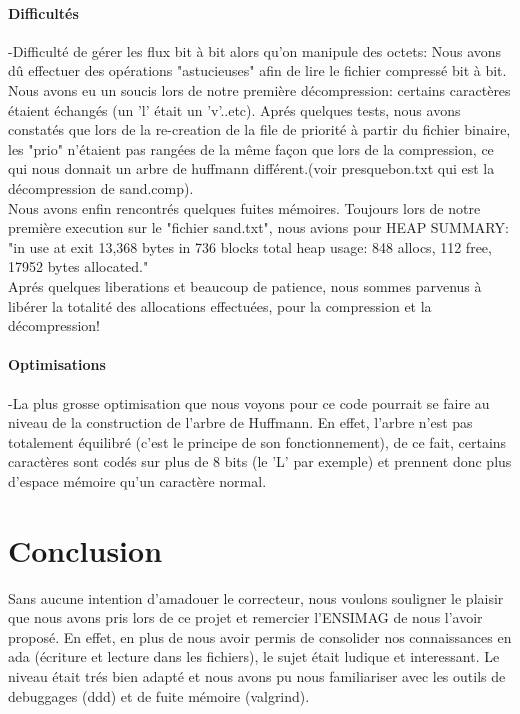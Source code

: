 \documentclass[11pt]{article}
\begin{document}
\paragraph{Difficultés}
-Difficulté de gérer les flux bit à bit alors qu'on manipule des octets: Nous avons dû effectuer des opérations "astucieuses" afin de lire le fichier compressé bit à bit.\\Nous avons eu un soucis lors de notre première décompression: certains caractères étaient échangés (un 'l' était un 'v'..etc). Aprés quelques tests, nous avons constatés que lors de la re-creation de la file de priorité à partir du fichier binaire, les "prio" n'étaient pas rangées de la même façon que lors de la compression, ce qui nous donnait un arbre de huffmann différent.(voir presquebon.txt qui est la décompression de sand.comp).\\Nous avons enfin rencontrés quelques fuites mémoires. Toujours lors de notre première execution sur le "fichier sand.txt", nous avions pour HEAP SUMMARY:\\
"in use at exit 13,368 bytes in 736 blocks
total heap usage: 848 allocs, 112 free, 17952 bytes allocated."\\Aprés quelques liberations et beaucoup de patience, nous sommes parvenus à libérer la totalité des allocations effectuées, pour la compression et la décompression!

\paragraph{Optimisations}-La plus grosse optimisation que nous voyons pour ce code pourrait se faire au niveau de la construction de l'arbre de Huffmann. En effet, l'arbre n'est pas totalement équilibré (c'est le principe de son fonctionnement), de ce fait, certains caractères sont codés sur plus de 8 bits (le 'L' par exemple) et prennent donc plus d'espace mémoire qu'un caractère normal.

\section{Conclusion}
Sans aucune intention d'amadouer le correcteur, nous voulons souligner le plaisir que nous avons pris lors de ce projet et remercier l'ENSIMAG de nous l'avoir proposé. En effet, en plus de nous avoir permis de consolider nos connaissances en ada (écriture et lecture dans les fichiers), le sujet était ludique et interessant. Le niveau était trés bien adapté et nous avons pu nous familiariser avec les outils de debuggages (ddd) et de fuite mémoire (valgrind).
\end{document}
